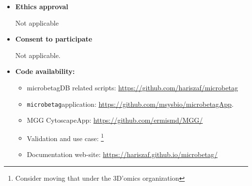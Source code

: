 \documentclass[sn-mathphys,Numbered]{sn-jnl}  %
\theoremstyle{thmstyleone}%
\theoremstyle{thmstyletwo}%
\theoremstyle{thmstylethree}%
\newcommand{\microbetag}{\texttt{microbetag}}
\begin{document}
\begin{itemize}
        \item \textbf{Ethics approval}

            Not applicable

        \item \textbf{Consent to participate}
        
            Not applicable.

        \item \textbf{Code availability: }

            \begin{itemize}
                \item microbetagDB related scripts: \href{https://github.com/hariszaf/microbetag}{https://github.com/hariszaf/microbetag}
                \item \microbetag application: \href{https://github.com/msysbio/microbetagApp}{https://github.com/msysbio/microbetagApp}.
                \item MGG CytoscapeApp: \href{https://github.com/ermismd/MGG/}{https://github.com/ermismd/MGG/}
                \item Validation and use case: \footnote{Consider moving that under the 3D'omics organization}
                \item Documentation web-site: \href{https://hariszaf.github.io/microbetag/}{https://hariszaf.github.io/microbetag/}
            \end{itemize}

    \end{itemize}
\end{document}
